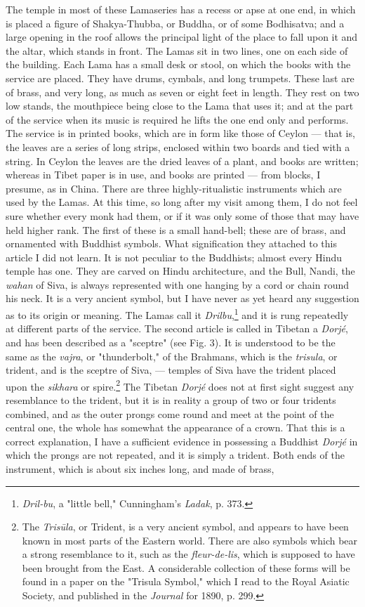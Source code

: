 \documentclass[a4paper, 11pt, oneside, polutonikogreek, english]{article}
\begin{document}
The temple in most of these Lamaseries has a recess or apse at one end, in which is placed a figure of Shakya-Thubba, or Buddha, or of some Bodhisatva; and a large opening in the roof allows the principal light of the place to fall upon it and the altar, which stands in front. The Lamas sit in two lines, one on each side of the building. Each Lama has a small desk or stool, on which the books with the service are placed. They have drums, cymbals, and long trumpets. These last are of brass, and very long, as much as seven or eight feet in length. They rest on two low stands, the mouthpiece being close to the Lama that uses it; and at the part of the service when its music is required he lifts the one end only and performs. The service is in printed books, which are in form like those of Ceylon --- that is, the leaves are a series of long strips, enclosed within two boards and tied with a string. In Ceylon the leaves are the dried leaves of a plant, and books are written; whereas in Tibet paper is in use, and books are printed --- from blocks, I presume, as in China. There are three highly-ritualistic instruments which are used by the Lamas. At this time, so long after my visit among them, I do not feel sure whether every monk had them, or if it was only some of those that may have held higher rank. The first of these is a small hand-bell; these are of brass, and ornamented with Buddhist symbols. What signification they attached to this article I did not learn. It is not peculiar to the Buddhists; almost every Hindu temple has one. They are carved on Hindu architecture, and the Bull, Nandi, the \emph{wahan} of Siva, is always represented with one hanging by a cord or chain round his neck. It is a very ancient symbol, but I have never as yet heard any suggestion as to its origin or meaning. The Lamas call it \emph{Drilbu},\footnote{\emph{Dril-bu}, a "little bell," Cunningham's \emph{Ladak}, p. 373.} and it is rung repeatedly at different parts of the service. The second article is called in Tibetan a \emph{Dorjé}, and has been described as a "sceptre" (see Fig. 3). It is understood to be the same as the \emph{vajra}, or "thunderbolt," of the Brahmans, which is the \emph{trisula}, or trident, and is the sceptre of Siva, --- temples of Siva have the trident placed upon the \emph{sikhara} or spire.\footnote{The \emph{Trisūla}, or Trident, is a very ancient symbol, and appears to have been known in most parts of the Eastern world. There are also symbols which bear a strong resemblance to it, such as the \emph{fleur-de-lis}, which is supposed to have been brought from the East. A considerable collection of these forms will be found in a paper on the "Trisula Symbol," which I read to the Royal Asiatic Society, and published in the \emph{Journal} for 1890, p. 299.} The Tibetan \emph{Dorjé} does not at first sight suggest any resemblance to the trident, but it is in reality a group of two or four tridents combined, and as the outer prongs come round and meet at the point of the central one, the whole has somewhat the appearance of a crown. That this is a correct explanation, I have a sufficient evidence in possessing a Buddhist \emph{Dorjé} in which the prongs are not repeated, and it is simply a trident. Both ends of the instrument, which is about six inches long, and made of brass, 
\end{document}
